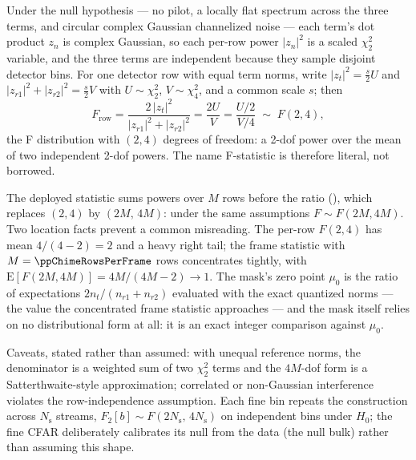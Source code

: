 \documentclass[10pt,letterpaper]{article}
\newcommand{\code}[1]{\texttt{\detokenize{#1}}}
\begin{document}
Under the null hypothesis --- no pilot, a locally flat spectrum across the
three terms, and circular complex Gaussian channelized noise --- each
term's dot product \(z_n\) is complex Gaussian, so each per-row power
\(|z_n|^2\) is a scaled \(\chi^2_2\) variable, and the three terms are
independent because they sample disjoint detector bins. For one detector
row with equal term norms, write \(|z_t|^2 = \tfrac{s}{2}U\) and
\(|z_{r1}|^2+|z_{r2}|^2 = \tfrac{s}{2}V\) with \(U\sim\chi^2_2\),
\(V\sim\chi^2_4\), and a common scale \(s\); then
\begin{equation}
F_{\mathrm{row}}
= \frac{2\,|z_t|^2}{|z_{r1}|^2+|z_{r2}|^2}
= \frac{2U}{V}
= \frac{U/2}{V/4}
\;\sim\; F(2,4),
\end{equation}
the F distribution with \((2,4)\) degrees of freedom: a 2-dof power over
the mean of two independent 2-dof powers. The name F-statistic is
therefore literal, not borrowed.

The deployed statistic sums powers over \(M\) rows before the ratio
(\code{all_rows_summed_before_ratio}), which replaces \((2,4)\) by
\((2M,\,4M)\): under the same assumptions \(F \sim F(2M, 4M)\). Two
location facts prevent a common misreading. The per-row \(F(2,4)\) has
mean \(4/(4-2)=2\) and a heavy right tail; the frame statistic with
\(M=\ppChimeRowsPerFrame\) rows concentrates tightly, with
\(\mathrm{E}[F(2M,4M)] = 4M/(4M-2) \to 1\). The mask's zero point
\(\mu_0\) is the ratio of expectations \(2 n_t/(n_{r1}+n_{r2})\) evaluated
with the exact quantized norms --- the value the concentrated frame
statistic approaches --- and the mask itself relies on no distributional
form at all: it is an exact integer comparison against \(\mu_0\).

Caveats, stated rather than assumed: with unequal reference norms, the
denominator is a weighted sum of two \(\chi^2_2\) terms and the \(4M\)-dof
form is a Satterthwaite-style approximation; correlated or non-Gaussian
interference violates the row-independence assumption. Each fine bin
repeats the construction across \(N_{\mathrm{s}}\) streams,
\(F_2[b] \sim F(2N_{\mathrm{s}},\,4N_{\mathrm{s}})\) on independent bins
under \(H_0\); the fine CFAR deliberately calibrates its null from the
data (the null bulk) rather than assuming this shape.
\end{document}
